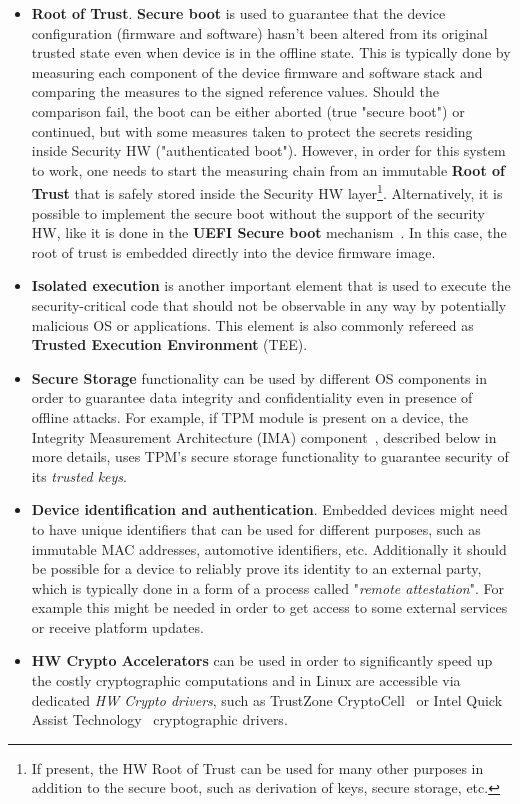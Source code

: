 \begin{itemize}
	\item \textbf{Root of Trust}. \textbf{Secure boot} is used to guarantee that the device configuration (firmware and software) hasn't been altered from its original trusted state even when device is in the offline state. This is typically done by measuring each component of the device firmware and software stack and comparing the measures to the signed reference values. Should the comparison fail, the boot can be either aborted (true "secure boot") or continued, but with some measures taken to protect the secrets residing inside Security HW ("authenticated boot"). However, in order for this system to work, one needs to start the measuring chain from an immutable \textbf{Root of Trust} that is safely stored inside the Security HW layer\footnote{If present, the HW Root of Trust can be used for many other purposes in addition to the secure boot, such as derivation of keys, secure storage, etc.}. Alternatively, it is possible to implement the secure boot without the support of the security HW, like it is done in the \textbf{UEFI Secure boot} mechanism~\cite{uefi}. In this case, the root of trust is embedded directly into the device firmware image.
	\item \textbf{Isolated execution} is another important element that is used to execute the security-critical code that should not be observable in any way by potentially malicious OS or applications. This element is also commonly refereed as \textbf{Trusted Execution Environment} (TEE).
	\item \textbf{Secure Storage} functionality can be used by different OS components in order to guarantee data integrity and confidentiality even in presence of offline attacks. For example, if TPM module is present on a device, the Integrity Measurement Architecture (IMA) component~\cite{ima}, described below in more details, uses TPM's secure storage functionality to guarantee security of its \textit{trusted keys}.
	\item \textbf{Device identification and authentication}. Embedded devices might need to have unique identifiers that can be used for different purposes, such as immutable MAC addresses, automotive identifiers, etc.  Additionally it should be possible for a device to reliably prove its identity to an external party, which is typically done in a form of a process called "\textit{remote attestation}". For example this might be needed in order to get access to some external services or receive platform updates.
	\item \textbf{HW Crypto Accelerators} can be used in order to significantly speed up the costly cryptographic computations and in Linux are accessible via dedicated \textit{HW Crypto drivers}, such as TrustZone CryptoCell~\cite{cryptocell} or Intel Quick Assist Technology~\cite{intelQAT} cryptographic drivers.
\end{itemize}

